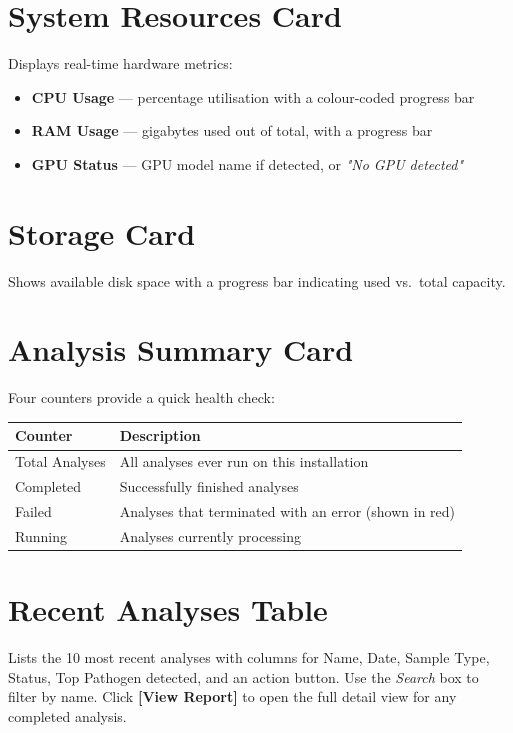 \documentclass[12pt,a4paper]{report}
\newcommand{\btn}[1]{\textbf{\textcolor{primary}{[#1]}}}
\newcommand{\field}[1]{\textit{#1}}
\begin{document}
\section{System Resources Card}

Displays real-time hardware metrics:

\begin{itemize}[leftmargin=1.5em]
  \item \textbf{CPU Usage} — percentage utilisation with a colour-coded progress bar
  \item \textbf{RAM Usage} — gigabytes used out of total, with a progress bar
  \item \textbf{GPU Status} — GPU model name if detected, or \textit{"No GPU detected"}
\end{itemize}

\section{Storage Card}

Shows available disk space with a progress bar indicating used vs.\ total capacity.

\section{Analysis Summary Card}

Four counters provide a quick health check:

\begin{center}
\begin{tabular}{lp{8cm}}
  \toprule
  \textbf{Counter} & \textbf{Description} \\
  \midrule
  Total Analyses & All analyses ever run on this installation \\
  Completed      & Successfully finished analyses \\
  Failed         & Analyses that terminated with an error (shown in red) \\
  Running        & Analyses currently processing \\
  \bottomrule
\end{tabular}
\end{center}

\section{Recent Analyses Table}

Lists the 10 most recent analyses with columns for Name, Date, Sample Type, Status, Top Pathogen detected, and an action button. Use the \field{Search} box to filter by name. Click \btn{View Report} to open the full detail view for any completed analysis.
\end{document}
